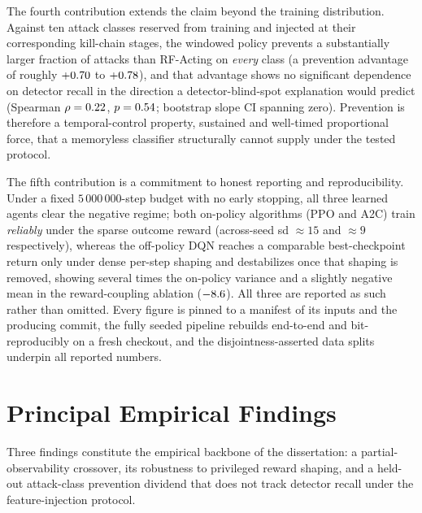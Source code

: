 The fourth contribution extends the claim beyond the training distribution. Against ten attack classes reserved from training and injected at their corresponding kill-chain stages, the windowed policy prevents a substantially larger fraction of attacks than RF-Acting on \emph{every} class (a prevention advantage of roughly $+0.70$ to $+0.78$), and that advantage shows no significant dependence on detector recall in the direction a detector-blind-spot explanation would predict (Spearman $\rho = 0.22$, $p = 0.54$; bootstrap slope CI spanning zero). Prevention is therefore a temporal-control property, sustained and well-timed proportional force, that a memoryless classifier structurally cannot supply under the tested protocol.

The fifth contribution is a commitment to honest reporting and reproducibility. Under a fixed $5\,000\,000$-step budget with no early stopping, all three learned agents clear the negative regime; both on-policy algorithms (PPO and A2C) train \emph{reliably} under the sparse outcome reward (across-seed sd $\approx 15$ and $\approx 9$ respectively), whereas the off-policy DQN reaches a comparable best-checkpoint return only under dense per-step shaping and destabilizes once that shaping is removed, showing several times the on-policy variance and a slightly negative mean in the reward-coupling ablation ($-8.6$). All three are reported as such rather than omitted. Every figure is pinned to a manifest of its inputs and the producing commit, the fully seeded pipeline rebuilds end-to-end and bit-reproducibly on a fresh checkout, and the disjointness-asserted data splits underpin all reported numbers.

\section{Principal Empirical Findings}\label{sec:findings}
Three findings constitute the empirical backbone of the dissertation: a partial-observability crossover, its robustness to privileged reward shaping, and a held-out attack-class prevention dividend that does not track detector recall under the feature-injection protocol.


